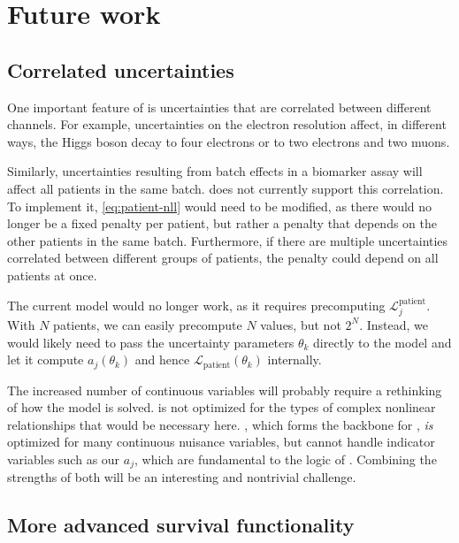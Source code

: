 \documentclass[article]{jss}
\begin{document}
\section{Future work}

\subsection{Correlated uncertainties}

One important feature of  is uncertainties that are correlated between different channels. For example, uncertainties on the electron resolution affect, in different ways, the Higgs boson decay to four electrons or to two electrons and two muons.

Similarly, uncertainties resulting from batch effects in a biomarker assay will affect all patients in the same batch\@.  does not currently support this correlation. To implement it, \cref{eq:patient-nll} would need to be modified, as there would no longer be a fixed penalty per patient, but rather a penalty that depends on the other patients in the same batch. Furthermore, if there are multiple uncertainties correlated between different groups of patients, the penalty could depend on all patients at once.

The current  model would no longer work, as it requires precomputing \(\mathcal{L}_j^{\text{patient}}\). With \(N\) patients, we can easily precompute \(N\) values, but not \(2^N\). Instead, we would likely need to pass the uncertainty parameters \(\theta_k\) directly to the  model and let it compute \(a_j\left(\theta_k\right)\) and hence \(\mathcal{L}_{\text{patient}}\left(\theta_k\right)\) internally.

The increased number of continuous variables will probably require a rethinking of how the model is solved\@.  is not optimized for the types of complex nonlinear relationships that would be necessary here\@. , which forms the backbone for , \emph{is} optimized for many continuous nuisance variables, but cannot handle indicator variables such as our \(a_j\), which are fundamental to the logic of . Combining the strengths of both will be an interesting and nontrivial challenge.

\subsection{More advanced survival functionality}
\end{document}
